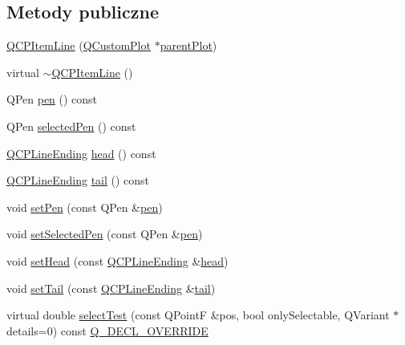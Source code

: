 \subsection*{Metody publiczne}
\begin{DoxyCompactItemize}
\item 
\hyperlink{class_q_c_p_item_line_a17804b7f64961c6accf25b61e85142e3}{Q\+C\+P\+Item\+Line} (\hyperlink{class_q_custom_plot}{Q\+Custom\+Plot} $\ast$\hyperlink{class_q_c_p_layerable_ab7e0e94461566093d36ffc0f5312b109}{parent\+Plot})
\item 
virtual \hyperlink{class_q_c_p_item_line_a94b5aaae048171e5306dc4695b991283}{$\sim$\+Q\+C\+P\+Item\+Line} ()
\item 
Q\+Pen \hyperlink{class_q_c_p_item_line_a235779dd079a263bedb20b3daecc40eb}{pen} () const 
\item 
Q\+Pen \hyperlink{class_q_c_p_item_line_a9fde5e95a1a369008252e18f1925650c}{selected\+Pen} () const 
\item 
\hyperlink{class_q_c_p_line_ending}{Q\+C\+P\+Line\+Ending} \hyperlink{class_q_c_p_item_line_a5f6cbc5c763feae9dfbce71748fc43f1}{head} () const 
\item 
\hyperlink{class_q_c_p_line_ending}{Q\+C\+P\+Line\+Ending} \hyperlink{class_q_c_p_item_line_a5d2ca0f784933e80f3e6e1d15dceebb3}{tail} () const 
\item 
void \hyperlink{class_q_c_p_item_line_a572528dab61c1abe205822fbd5db4b27}{set\+Pen} (const Q\+Pen \&\hyperlink{class_q_c_p_item_line_a235779dd079a263bedb20b3daecc40eb}{pen})
\item 
void \hyperlink{class_q_c_p_item_line_a3e2fec44503277e77717e9c24f87f1ea}{set\+Selected\+Pen} (const Q\+Pen \&\hyperlink{class_q_c_p_item_line_a235779dd079a263bedb20b3daecc40eb}{pen})
\item 
void \hyperlink{class_q_c_p_item_line_aebf3d687114d584e0459db6759e2c3c3}{set\+Head} (const \hyperlink{class_q_c_p_line_ending}{Q\+C\+P\+Line\+Ending} \&\hyperlink{class_q_c_p_item_line_a5f6cbc5c763feae9dfbce71748fc43f1}{head})
\item 
void \hyperlink{class_q_c_p_item_line_ac264222c3297a7efe33df9345c811a5f}{set\+Tail} (const \hyperlink{class_q_c_p_line_ending}{Q\+C\+P\+Line\+Ending} \&\hyperlink{class_q_c_p_item_line_a5d2ca0f784933e80f3e6e1d15dceebb3}{tail})
\item 
virtual double \hyperlink{class_q_c_p_item_line_a8e02bfbca04fbcf3dbc375a2bf693229}{select\+Test} (const Q\+PointF \&pos, bool only\+Selectable, Q\+Variant $\ast$details=0) const \hyperlink{qcustomplot_8hh_a42cc5eaeb25b85f8b52d2a4b94c56f55}{Q\+\_\+\+D\+E\+C\+L\+\_\+\+O\+V\+E\+R\+R\+I\+DE}
\end{DoxyCompactItemize}
